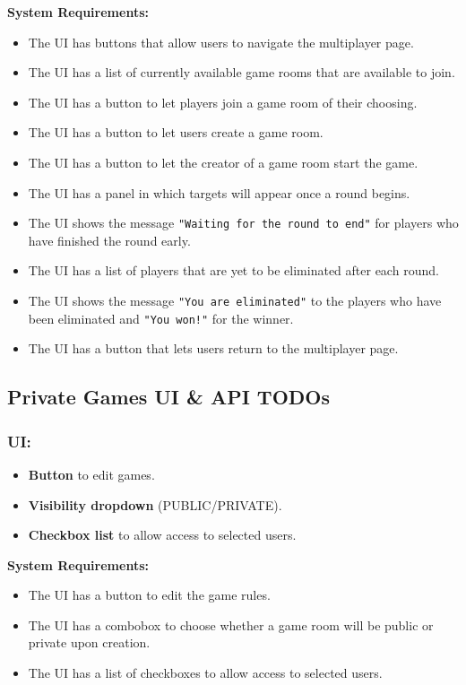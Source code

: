 \documentclass[]{VUMIFTemplateClass}
\begin{document}
\textbf{System Requirements:}
\begin{itemize}
    \item The UI has buttons that allow users to navigate the multiplayer page.
    \item The UI has a list of currently available game rooms that are available to join.
    \item The UI has a button to let players join a game room of their choosing.
    \item The UI has a button to let users create a game room.
    \item The UI has a button to let the creator of a game room start the game.
    \item The UI has a panel in which targets will appear once a round begins.
    \item The UI shows the message \texttt{"Waiting for the round to end"} for players who have finished the round early.
    \item The UI has a list of players that are yet to be eliminated after each round.
    \item The UI shows the message \texttt{"You are eliminated"} to the players who have been eliminated and \texttt{"You won!"} for the winner.
    \item The UI has a button that lets users return to the multiplayer page.
\end{itemize}

\subsection{Private Games UI \& API TODOs}

\subsubsection{UI:}
\begin{itemize}
    \item \textbf{Button} to edit games.
    \item \textbf{Visibility dropdown} (PUBLIC/PRIVATE).
    \item \textbf{Checkbox list} to allow access to selected users.
\end{itemize}

\textbf{System Requirements:}
\begin{itemize}
    \item The UI has a button to edit the game rules.
    \item The UI has a combobox to choose whether a game room will be public or private upon creation.
    \item The UI has a list of checkboxes to allow access to selected users.
\end{itemize}
\end{document}
